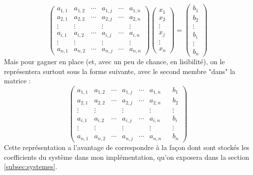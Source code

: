 \documentclass[french]{article}
\begin{document}
\begin{equation*}
	\begin{pmatrix}
		a_{1,1} & a_{1,2} & \cdots & a_{1,j} & \cdots & a_{1,n}\\
		a_{2,1} & a_{2,2} & \cdots & a_{2,j} & \cdots & a_{2,n}\\
		\vdots  & \vdots  & & \vdots & & \vdots\\
		a_{i,1} & a_{i,2} & \cdots & a_{i,j} & \cdots & a_{i,n}\\
		\vdots  & \vdots  &  & \vdots & &\vdots\\
		a_{n,1} & a_{n,2} & \cdots & a_{n,j} & \cdots & a_{n,n}
	\end{pmatrix}
	\begin{pmatrix}
		x_1\\
		x_2\\
		\vdots\\
		x_j\\
		\vdots\\
		x_n
	\end{pmatrix}
	=
	\begin{pmatrix}
		b_1\\
		b_2\\
		\vdots\\
		b_i\\
		\vdots\\
		b_n
	\end{pmatrix}
\end{equation*}
Mais pour gagner en place (et, avec un peu de chance, en lisibilité), on le représentera surtout sous la forme suivante, avec le second membre "dans" la matrice :
\begin{equation*}
	\begin{pmatrix}
		a_{1,1} & a_{1,2} & \cdots & a_{1,j} & \cdots & a_{1,n}&&b_1\\
		a_{2,1} & a_{2,2} & \cdots & a_{2,j} & \cdots & a_{2,n}&&b_2\\
		\vdots  & \vdots  & & \vdots & & \vdots&&\vdots\\
		a_{i,1} & a_{i,2} & \cdots & a_{i,j} & \cdots & a_{i,n}&&b_i\\
		\vdots  & \vdots  &  & \vdots & &\vdots&&\vdots\\
		a_{n,1} & a_{n,2} & \cdots & a_{n,j} & \cdots & a_{n,n}&&b_n
	\end{pmatrix}
\end{equation*}
Cette représentation a l'avantage de correspondre à la façon dont sont stockés les coefficients du système dans mon implémentation, qu'on exposera dans la section \ref{subsec:systemes}.
\end{document}
